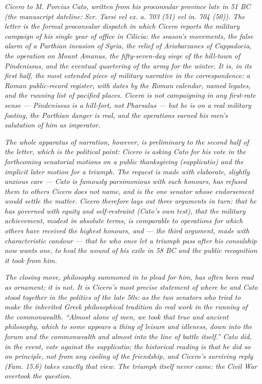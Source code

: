 
\textit{Cicero to M. Porcius Cato, written from his
proconsular province late in 51 BC (the manuscript
dateline: \textit{Scr. Tarsi vel ex. a. 703 (51) vel in.
704 (50)}). The letter is the formal proconsular
dispatch in which Cicero reports the military campaign
of his single year of office in Cilicia: the season's
movements, the false alarm of a Parthian invasion of
Syria, the relief of Ariobarzanes of Cappadocia, the
operation on Mount Amanus, the fifty-seven-day siege of
the hill-town of Pindenissus, and the eventual quartering
of the army for the winter. It is, in its first half,
the most extended piece of military narrative in the
correspondence: a Roman public-record register, with
dates by the Roman calendar, named legates, and the
running list of pacified places. Cicero is not
campaigning in any first-rate sense --- Pindenissus is a
hill-fort, not Pharsalus --- but he is on a real
military footing, the Parthian danger is real, and the
operations earned his men's salutation of him as
\textit{imperator}.}

\textit{The whole apparatus of narration, however, is
preliminary to the second half of the letter, which is
the political point: Cicero is asking Cato for his vote
in the forthcoming senatorial motions on a public
thanksgiving (\textit{supplicatio}) and the implicit
later motion for a triumph. The request is made with
elaborate, slightly anxious care --- Cato is famously
parsimonious with such honours, has refused them to
others Cicero does not name, and is the one senator
whose endorsement would settle the matter. Cicero
therefore lays out three arguments in turn: that he has
governed with equity and self-restraint (Cato's own
test), that the military achievement, modest in absolute
terms, is comparable to operations for which others have
received the highest honours, and --- the third
argument, made with characteristic candour --- that he
who once let a triumph pass after his consulship now
wants one, to heal the wound of his exile in 58 BC and
the public recognition it took from him.}

\textit{The closing move, philosophy summoned in to plead
for him, has often been read as ornament; it is not. It
is Cicero's most precise statement of where he and Cato
stood together in the politics of the late 50s: as the
two senators who tried to make the inherited Greek
philosophical tradition do real work in the running of
the commonwealth. ``Almost alone of men, we took that
true and ancient philosophy, which to some appears a
thing of leisure and idleness, down into the forum and
the commonwealth and almost into the line of battle
itself.'' Cato did, in the event, vote against the
supplicatio; the historical reading is that he did so
on principle, not from any cooling of the friendship,
and Cicero's surviving reply (\textit{Fam.} 15.6) takes
exactly that view. The triumph itself never came: the
Civil War overtook the question.}
